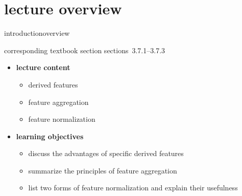 

\subtitle{Module 3.7.1: Feature Post-Processing}


	

    \section[overview]{lecture overview}
        \begin{frame}{introduction}{overview}
            \begin{block}{corresponding textbook section}
                    sections~3.7.1--3.7.3
            \end{block}

            \begin{itemize}
                \item   \textbf{lecture content}
                    \begin{itemize}
                        \item       derived features
                        \item       feature aggregation
                        \item       feature normalization
                    \end{itemize}
                \bigskip
                \item<2->   \textbf{learning objectives}
                    \begin{itemize}
                        \item       discuss the advantages of specific derived features
                        \item       summarize the principles of feature aggregation
                        \item       list two forms of feature normalization and explain their usefulness
                    \end{itemize}
            \end{itemize}
        \end{frame}

